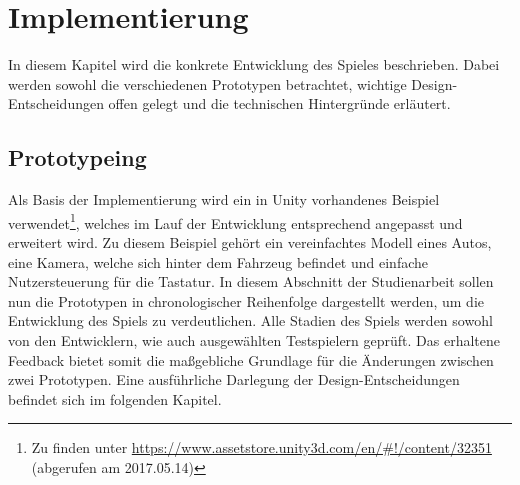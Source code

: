 \section{Implementierung}\label{sec:impl}
In diesem Kapitel wird die konkrete Entwicklung des Spieles beschrieben. Dabei werden sowohl die verschiedenen Prototypen betrachtet, wichtige Design-Entscheidungen offen gelegt und die technischen Hintergründe erläutert.
\subsection{Prototypeing}
	Als Basis der Implementierung wird ein in Unity vorhandenes Beispiel verwendet\footnote{Zu finden unter \url{https://www.assetstore.unity3d.com/en/\#!/content/32351} (abgerufen am 2017.05.14)}, welches im Lauf der Entwicklung entsprechend angepasst und erweitert wird. Zu diesem Beispiel gehört ein vereinfachtes Modell eines Autos, eine Kamera, welche sich hinter dem Fahrzeug befindet und einfache Nutzersteuerung für die Tastatur.
	In diesem Abschnitt der Studienarbeit sollen nun die Prototypen in chronologischer Reihenfolge dargestellt werden, um die Entwicklung des Spiels zu verdeutlichen. Alle Stadien des Spiels werden sowohl von den Entwicklern, wie auch ausgewählten Testspielern geprüft. Das erhaltene Feedback bietet somit die maßgebliche Grundlage für die Änderungen zwischen zwei Prototypen. Eine ausführliche Darlegung der Design-Entscheidungen befindet sich im folgenden Kapitel.
